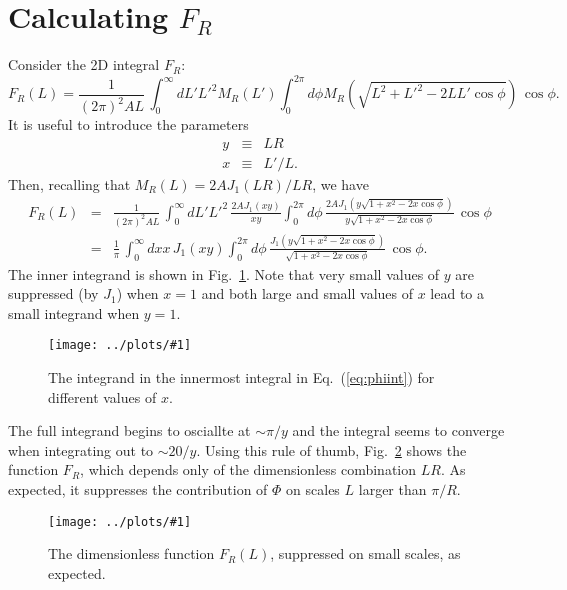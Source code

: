 \documentclass[prd,amsmath,amssymb,floatfix,superscriptaddress,nofootinbib]{revtex4-1}
\def\be{\begin{equation}}
\def\ee{\end{equation}}
\def\bea{\begin{eqnarray}}
\def\eea{\end{eqnarray}}
\newcommand{\vs}{\nonumber\\}
\newcommand{\ec}[1]{Eq.~(\ref{eq:#1})}
\newcommand{\eql}[1]{\label{eq:#1}}
\newcommand{\rf}[1]{\ref{fig:#1}}
\newcommand{\sfigg}[2]{
\texttt{[image: ../plots/\#1]}
        }
\newcommand{\Spng}[2]{
   \begin{figure}[thbp]
   \begin{center}
    \sfigg{../plots/#1.png}{.7\columnwidth}
    \caption{{\small #2}}
    \label{fig:#1}
     \end{center}
   \end{figure}
}
\begin{document}
\section{Calculating $F_R$}
Consider the 2D integral $F_R$:
\be
 F_R(L) = \frac1{(2\pi)^2AL}\, \int_0^\infty dL' L'^2 M_R(L')  \int_0^{2\pi} d\phi M_R\left(\sqrt{L^2+L'^2-2LL'\cos\phi}\right)  \,\cos\phi.\ee
 It is useful to introduce the parameters
 \bea
 y &\equiv& LR\vs
 x &\equiv& L'/L.\eea
 Then, recalling that $M_R(L) = 2A J_1(LR)/LR$, we have
 \bea
 F_R(L) &=& \frac1{(2\pi)^2AL}\, \int_0^\infty dL' L'^2 \, \frac{2AJ_1(xy)}{xy} \int_0^{2\pi} d\phi \,\frac{2A J_1(y\sqrt{1+x^2-2x\cos\phi})}{y\sqrt{1+x^2-2x\cos\phi}}
 \,\cos\phi
 \vs
 &=&\frac{1}{\pi}\, \int_0^\infty dx x \, {J_1(xy)}\int_0^{2\pi} d\phi \,\frac{J_1(y\sqrt{1+x^2-2x\cos\phi})}{\sqrt{1+x^2-2x\cos\phi}}
 \,\cos\phi.\eql{phiint}
 \eea
 The inner integrand is shown in Fig.~\rf{phiinty}. Note that very small values of $y$ are suppressed (by $J_1$) when $x=1$ and both large and small values of $x$ lead to a small integrand when $y=1$. %
 \Spng{phiinty}{The integrand in the innermost integral in \ec{phiint} for different values of $x$.}
 The full integrand begins to osciallte at $\sim\pi/y$ and the integral seems to converge when integrating out to $\sim20/y$. Using this rule of thumb, Fig.~\rf{mr} shows the function $F_R$, 
 which depends only of the dimensionless combination $LR$. As expected, it suppresses the contribution of $\Phi$ on scales $L$ larger than $\pi/R$.
 \Spng{mr}{The dimensionless function $F_R(L)$, suppressed on small scales, as expected.}


\end{document}
